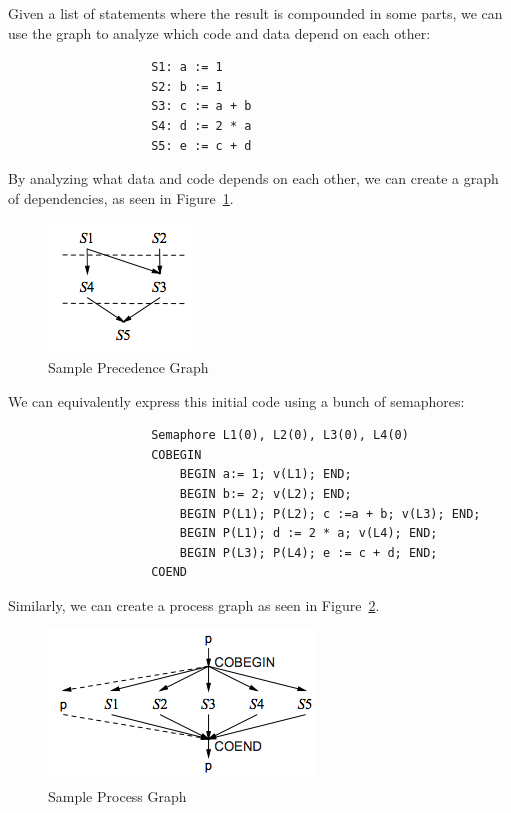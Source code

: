                 Given a list of statements where the result is compounded in some parts, we can use the graph to analyze which code and data depend on each other:
                \begin{verbatim}
                    S1: a := 1
                    S2: b := 1
                    S3: c := a + b
                    S4: d := 2 * a
                    S5: e := c + d
                \end{verbatim}
                By analyzing what data and code depends on each other, we can create a graph of dependencies, as seen in Figure~\ref{fig:precedence_graph}.
                \begin{figure}[h]
                    \centering
                    \label{fig:precedence_graph}
                    \caption{Sample Precedence Graph}
                    \includegraphics{images/precedence_graph.png}
                \end{figure}
                We can equivalently express this initial code using a bunch of semaphores:
                \begin{verbatim}
                    Semaphore L1(0), L2(0), L3(0), L4(0)
                    COBEGIN
                        BEGIN a:= 1; v(L1); END;
                        BEGIN b:= 2; v(L2); END;
                        BEGIN P(L1); P(L2); c :=a + b; v(L3); END;
                        BEGIN P(L1); d := 2 * a; v(L4); END;
                        BEGIN P(L3); P(L4); e := c + d; END;
                    COEND
                \end{verbatim}
                Similarly, we can create a process graph as seen in Figure~\ref{fig:process_graph}.
                \begin{figure}[h]
                    \centering
                    \label{fig:process_graph}
                    \caption{Sample Process Graph}
                    \includegraphics{images/proccess_graph.png}
                \end{figure}
